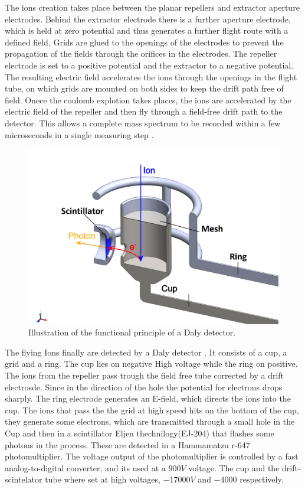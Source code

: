 The ions creation takes place between the planar repellers and extractor aperture electrodes. Behind the extractor electrode there is a further aperture electrode, which is held at zero potential and thus generates a further flight route with a defined field, Grids are glued to the openings of the electrodes to prevent the propagation of the fields through the orifices in the electrodes. The repeller electrode is set to a positive potential and the extractor to a negative potential. The resulting electric field accelerates the ions through the openings in the flight tube, on which grids are mounted on both sides to keep the drift path free of field.
Onece the coulomb explotion takes places, the ions are accelerated by the electric field of the repeller and then fly through a field-free drift path to the detector. This allows a complete mass spectrum to be recorded within a few microseconds in a single measuring step \cite{mobius_time--flight_2016}.

\begin{figure}[hbtp]

\centering
\includegraphics[scale=1]{../Images/Cup scintillator.png}
\caption[TOF cup]{Illustration of the functional principle of a Daly detector.}
\end{figure}

The flying Ions finally are detected by a  Daly detector \cite{daly_scintillation_1960}. It consists of a cup, a grid and a ring. The cup lies on negative High voltage while the ring on positive. The ions from the repeller pass trough the field free tube corrected by a drift electrosde.  Since in the direction of the hole the potential for electrons drops sharply. The ring electrode generates an E-field, which directs the ions into the cup. The ions that pass the  the grid at high speed hits on the bottom of the cup, they generate some electrons, which are transmitted through a small hole in the Cup and then in a scintillator Eljen thechnilogy(EJ-204) that flashes some photons in the process. These are detected in a Hammamatzu r-647 photomultiplier. The voltage output of the photomultiplier is controlled by a fast analog-to-digital converter, and its used at a $900V$ voltage. The cup and the drift-scintelator  tube where set at high voltages,  $-17000V$ and $-4000$ respectively.

